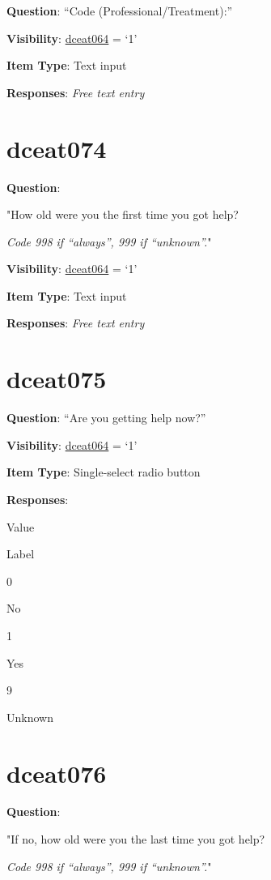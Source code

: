\documentclass[]{book}
\begin{document}
\textbf{Question}: ``Code (Professional/Treatment):''

\textbf{Visibility}: \protect\hyperlink{dceat064}{dceat064} = `1'

\textbf{Item Type}: Text input

\textbf{Responses}: \emph{Free text entry}

\hypertarget{dceat074}{%
\section{dceat074}\label{dceat074}}

\textbf{Question}:

"How old were you the first time you got help?

\emph{Code 998 if ``always'', 999 if ``unknown''.}"

\textbf{Visibility}: \protect\hyperlink{dceat064}{dceat064} = `1'

\textbf{Item Type}: Text input

\textbf{Responses}: \emph{Free text entry}

\hypertarget{dceat075}{%
\section{dceat075}\label{dceat075}}

\textbf{Question}: ``Are you getting help now?''

\textbf{Visibility}: \protect\hyperlink{dceat064}{dceat064} = `1'

\textbf{Item Type}: Single-select radio button

\textbf{Responses}:

Value

Label

0

No

1

Yes

9

Unknown

\hypertarget{dceat076}{%
\section{dceat076}\label{dceat076}}

\textbf{Question}:

"If no, how old were you the last time you got help?

\emph{Code 998 if ``always'', 999 if ``unknown''.}"
\end{document}
